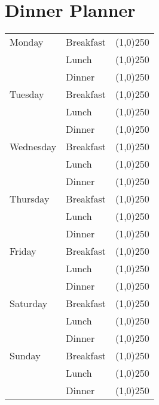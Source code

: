 \documentclass[12pt]{article}
\newcommand{\meals}[3]{& #1 & \line(1,0){250} \\ 
											 & #2 &\line(1,0){250} \\
											 & #3 &\line(1,0){250} \\}
\begin{document}
\section*{Dinner Planner}

\begin{tabularx}{\textwidth}{llc}
	\toprule
	Monday
		\meals{Breakfast}{Lunch}{Dinner}
	\midrule
	Tuesday
		\meals{Breakfast}{Lunch}{Dinner}
	\midrule 
	Wednesday
		\meals{Breakfast}{Lunch}{Dinner}
  \midrule
	Thursday
	 	\meals{Breakfast}{Lunch}{Dinner}
  \midrule
	Friday
	 	\meals{Breakfast}{Lunch}{Dinner}
	\midrule
	Saturday
	 	\meals{Breakfast}{Lunch}{Dinner}
  \midrule
	Sunday
	 	\meals{Breakfast}{Lunch}{Dinner}
  \bottomrule
\end{tabularx}
\end{document}
